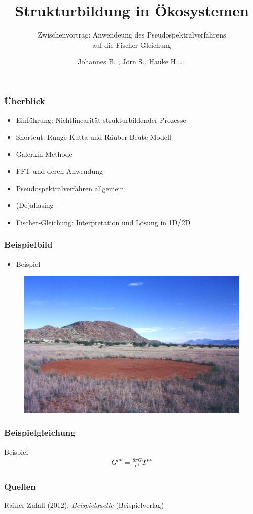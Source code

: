\documentclass[german, ngerman]{beamer}
\title{Strukturbildung in Ökosystemen}
\subtitle{Zwischenvortrag: Anwendeung des Pseudospektralverfahrens \\ auf die Fischer-Gleichung}
\author{Johannes B. , Jörn S., Hauke H.,...}
\institute{}
\date{}
\begin{document}
\begin{frame}[plain]
	\titlepage
\end{frame}

\begin{frame}
\frametitle{Überblick}

\begin{itemize}
	\item Einführung: Nichtlinearität strukturbildender Prozesse
	\item Shortcut: Runge-Kutta und Räuber-Beute-Modell
	\item Galerkin-Methode
	\item FFT und deren Anwendung 
	\item Pseudospektralverfahren allgemein 
	\item (De)aliasing
	\item  Fischer-Gleichung: Interpretation und Lösung in 1D/2D
	
	
\end{itemize}
\end{frame}

\begin{frame}
\frametitle{Beispielbild}  
\begin{itemize}
	\item Beispiel
\end{itemize}
\begin{figure}
	\centering
	\includegraphics[scale=0.95]{Bilder/beispielbild.jpg}
\end{figure}


\end{frame}


\begin{frame}
\frametitle{Beispielgleichung}

\begin{block}  {Beispiel}
\begin{align*} 
G^{\mu \nu} = \frac{8\pi G}{c^4} T^{\mu \nu}                 
\end{align*}

\end{block}


\end{frame}


\begin{frame}
\frametitle{Quellen}

\begin{thebibliography}{9}


Rainer Zufall (2012): \textit{Beispielquelle} (Beispielverlag)

\end{thebibliography}
\end{frame}
\end{document}
